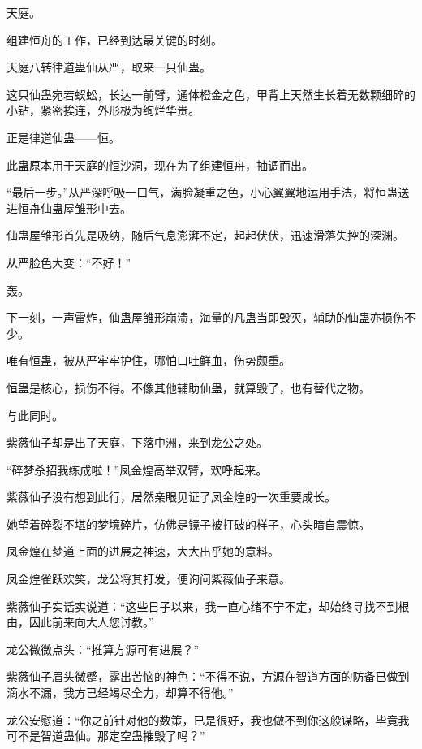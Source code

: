
\begin{this_body}



天庭。

组建恒舟的工作，已经到达最关键的时刻。

天庭八转律道蛊仙从严，取来一只仙蛊。

这只仙蛊宛若蜈蚣，长达一前臂，通体橙金之色，甲背上天然生长着无数颗细碎的小钻，紧密挨连，外形极为绚烂华贵。

正是律道仙蛊——恒。

此蛊原本用于天庭的恒沙洞，现在为了组建恒舟，抽调而出。

“最后一步。”从严深呼吸一口气，满脸凝重之色，小心翼翼地运用手法，将恒蛊送进恒舟仙蛊屋雏形中去。

仙蛊屋雏形首先是吸纳，随后气息澎湃不定，起起伏伏，迅速滑落失控的深渊。

从严脸色大变：“不好！”

轰。

下一刻，一声雷炸，仙蛊屋雏形崩溃，海量的凡蛊当即毁灭，辅助的仙蛊亦损伤不少。

唯有恒蛊，被从严牢牢护住，哪怕口吐鲜血，伤势颇重。

恒蛊是核心，损伤不得。不像其他辅助仙蛊，就算毁了，也有替代之物。

与此同时。

紫薇仙子却是出了天庭，下落中洲，来到龙公之处。

“碎梦杀招我练成啦！”凤金煌高举双臂，欢呼起来。

紫薇仙子没有想到此行，居然亲眼见证了凤金煌的一次重要成长。

她望着碎裂不堪的梦境碎片，仿佛是镜子被打破的样子，心头暗自震惊。

凤金煌在梦道上面的进展之神速，大大出乎她的意料。

凤金煌雀跃欢笑，龙公将其打发，便询问紫薇仙子来意。

紫薇仙子实话实说道：“这些日子以来，我一直心绪不宁不定，却始终寻找不到根由，因此前来向大人您讨教。”

龙公微微点头：“推算方源可有进展？”

紫薇仙子眉头微蹙，露出苦恼的神色：“不得不说，方源在智道方面的防备已做到滴水不漏，我方已经竭尽全力，却算不得他。”

龙公安慰道：“你之前针对他的数策，已是很好，我也做不到你这般谋略，毕竟我可不是智道蛊仙。那定空蛊摧毁了吗？”


\end{this_body}
